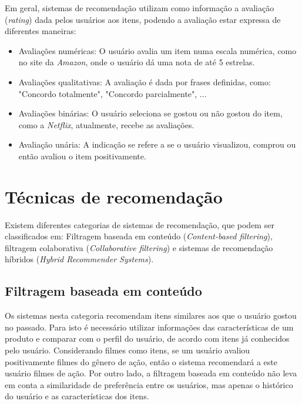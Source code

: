 \documentclass[12pt,a4paper,header]{abnt}
\begin{document}
Em geral, sistemas de recomendação utilizam como informação a avaliação (\textit{rating}) dada pelos usuários aos itens, podendo a avaliação estar expressa de diferentes maneiras\cite{shapira2011recommender}:

\begin{itemize}

\item Avaliações numéricas: O usuário avalia um item numa escala numérica, como no site da \textit{Amazon}, onde o usuário dá uma nota de até 5 estrelas.

\item Avaliações qualitativas: A avaliação é dada por frases definidas, como: "Concordo totalmente", "Concordo parcialmente", ...

\item Avaliações binárias: O usuário seleciona se gostou ou não gostou do item, como a \textit{Netflix}, atualmente, recebe as avaliações.

\item Avaliação unária: A indicação se refere a se o usuário visualizou, comprou ou então avaliou o item positivamente.

\end{itemize}

\section{Técnicas de recomendação}

Existem diferentes categorias de sistemas de recomendação, que podem ser classificados em: Filtragem baseada em conteúdo (\textit{Content-based filtering}), filtragem colaborativa (\textit{Collaborative filtering}) e sistemas de recomendação híbridos (\textit{Hybrid Recommender Systems})\cite{melville2011recommender}.

\subsection{Filtragem baseada em conteúdo}

Os sistemas nesta categoria recomendam itens similares aos que o usuário gostou no passado\cite{gorakala2015building}. Para isto é necessário utilizar informações das características de um produto\cite{shapira2011recommender} e comparar com o perfil do usuário, de acordo com itens já conhecidos pelo usuário. Considerando filmes como itens, se um usuário avaliou positivamente filmes do gênero de ação, então o sistema recomendará a este usuário filmes de ação. Por outro lado, a filtragem baseada em conteúdo não leva em conta a similaridade de preferência entre os usuários, mas apenas o histórico do usuário e as características dos itens\cite{gorakala2015building}.
\end{document}
